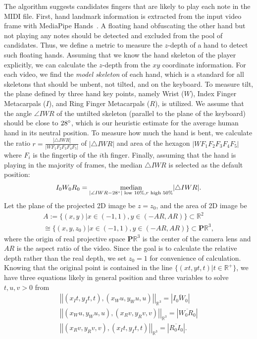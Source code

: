 \documentclass{article}
\begin{document}
The algorithm suggests candidates fingers that are likely to play each note in the MIDI file. First, hand landmark information is extracted from the input video frame with MediaPipe Hands~\cite{arXiv20Zhang}. A floating hand obfuscating the other hand but not playing any notes should be detected and excluded from the pool of candidates. Thus, we define a metric to measure the $z$-depth of a hand to detect such floating hands. Assuming that we know the hand skeleton of the player explicitly, we can calculate the $z$-depth from the $xy$ coordinate information. For each video, we find the \textit{model skeleton} of each hand, which is a standard for all skeletons that should be unbent, not tilted, and on the keyboard. To measure tilt, the plane defined by three hand key points, namely Wrist ($W$), Index Finger Metacarpals ($I$), and Ring Finger Metacarpals ($R$), is utilized. We assume that the angle $\angle IWR$ of the untilted skeleton (parallel to the plane of the keyboard) should be close to $28\degree$, which is our heuristic estimate for the average human hand in its neutral position. To measure how much the hand is bent, we calculate the ratio $r=\frac{|\triangle IWR|}{|WF_{1}F_{2}F_{3}F_{4}F_{5}|}$ of $|\triangle IWR|$ and area of the hexagon $|WF_{1}F_{2}F_{3}F_{4}F_{5}|$ where $F_i$ is the fingertip of the $i$th finger. Finally, assuming that the hand is playing in the majority of frames, the median $\triangle IWR$ is selected as the default position:
\begin{equation}
    I_{0}W_{0}R_{0}=\underset{|\angle IWR - 28\degree| \text{ low 10\%}, r \text{ high 50\%}}{\text{median}}|\triangle IWR| .
\end{equation}
Let the plane of the projected 2D image be $z=z_{0}$, and the area of 2D image be
\begin{equation}
  \begin{aligned}
    A:=\{(x,y)  | x\in (-1,1), y\in (-AR,AR)\} \subset \mathbb{R}^2
    \\\cong\{(x,y,z_{0})|x\in(-1,1), y\in (-AR,AR)\}\subset \mathbf{P}\mathbb{R}^3 ,
\end{aligned}  
\end{equation}
where the origin of real projective space $\mathbf{P}\mathbb{R}^3$ is the center of the camera lens and $AR$ is the aspect ratio of the video. Since the goal is to calculate the relative depth rather than the real depth, we set $z_{0}=1$ for convenience of calculation.
Knowing that the original point is contained in the line $\{(xt,yt,t) | t\in \mathbb{R^{+}}\}$, we have three equations likely in general position and three variables to solve $t,u,v>0$ from
\begin{gather}
    \left||(x_{I}t,y_{I}t,t),(x_{W}u,y_{W}u,u)|\right|_{\mathbb{R}^3}=\left|\overline{I_{0}W_{0}}\right| \\
    \left||(x_{W}u,y_{W}u,u),(x_{R}v,y_{R}v,v)|\right|_{\mathbb{R}^3}=\left|\overline{W_{0}R_{0}}\right| \\
    \left||(x_{R}v,y_{R}v,v),(x_{I}t,y_{I}t,t)|\right|_{\mathbb{R}^3}=\left|\overline{R_{0}I_{0}}\right|.
\end{gather}
\end{document}
